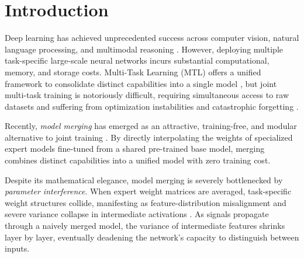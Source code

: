 \documentclass{article}
\theoremstyle{plain}
\theoremstyle{definition}
\theoremstyle{remark}
\begin{document}
\section{Introduction}
\label{sec:intro}
Deep learning has achieved unprecedented success across computer vision, natural language processing, and multimodal reasoning \cite{vaswani2017attention, devlin2018bert, brown2020language, dosovitskiy2020image}. However, deploying multiple task-specific large-scale neural networks incurs substantial computational, memory, and storage costs. Multi-Task Learning (MTL) offers a unified framework to consolidate distinct capabilities into a single model \cite{caruana1997multitask}, but joint multi-task training is notoriously difficult, requiring simultaneous access to raw datasets and suffering from optimization instabilities and catastrophic forgetting \cite{kirkpatrick2017overcoming}.

Recently, \textit{model merging} has emerged as an attractive, training-free, and modular alternative to joint training \cite{ilharco2022editing, yadav2023ties, yu2024dare, ainsworth2022git, zhao2024recent, zhou2026demystifying, song2026model, abdollahpoorrostam2026model, tang2025merging, li2025model, laloue2025merging, sun2025merging, djuhera2025safemerge, yang2025data, zeng2025robustmerge, sun2025task}. By directly interpolating the weights of specialized expert models fine-tuned from a shared pre-trained base model, merging combines distinct capabilities into a unified model with zero training cost.

Despite its mathematical elegance, model merging is severely bottlenecked by \textit{parameter interference}. When expert weight matrices are averaged, task-specific weight structures collide, manifesting as feature-distribution misalignment and severe variance collapse in intermediate activations \cite{jordan2022repair, nobari2025activationinformed}. As signals propagate through a naively merged model, the variance of intermediate features shrinks layer by layer, eventually deadening the network's capacity to distinguish between inputs.
\end{document}
